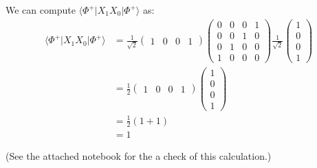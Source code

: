\documentclass[12pt]{extarticle}
\begin{document}
\begin{enumerate}[(a)]
We can compute $\langle \Phi^{+}|X_1X_0|\Phi^{+}\rangle$ as:
\begin{align*}
\langle \Phi^{+}|X_1X_0|\Phi^{+}\rangle
& = \frac{1}{\sqrt{2}}\begin{pmatrix}1&0&0&1\end{pmatrix}
\begin{pmatrix}0&0&0&1\\0&0&1&0\\0&1&0&0\\1&0&0&0\end{pmatrix}
\frac{1}{\sqrt{2}} \begin{pmatrix}1\\0\\0\\1\end{pmatrix} \\
& = \frac{1}{2}\begin{pmatrix}1&0&0&1\end{pmatrix} \begin{pmatrix}1\\0\\0\\1\end{pmatrix} \\
& = \frac{1}{2}(1+1) \\
& = 1
\end{align*}

(See the attached {\mathematica}
notebook for the a check of this calculation.)

\end{enumerate}
\end{document}
